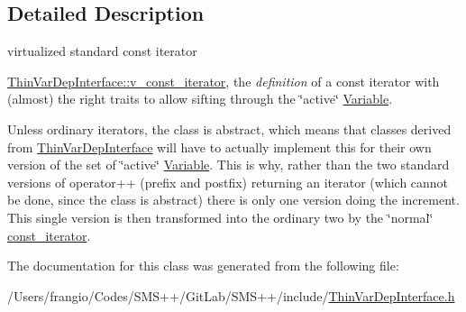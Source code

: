 \subsection{Detailed Description}
virtualized standard const iterator 

\mbox{\hyperlink{class_s_m_spp__di__unipi__it_1_1_thin_var_dep_interface_1_1v__const__iterator}{Thin\+Var\+Dep\+Interface\+::v\+\_\+const\+\_\+iterator}}, the {\itshape definition} of a const iterator with (almost) the right traits to allow sifting through the \char`\"{}active\char`\"{} \mbox{\hyperlink{class_s_m_spp__di__unipi__it_1_1_variable}{Variable}}.

Unless ordinary iterators, the class is abstract, which means that classes derived from \mbox{\hyperlink{class_s_m_spp__di__unipi__it_1_1_thin_var_dep_interface}{Thin\+Var\+Dep\+Interface}} will have to actually implement this for their own version of the set of \char`\"{}active\char`\"{} \mbox{\hyperlink{class_s_m_spp__di__unipi__it_1_1_variable}{Variable}}. This is why, rather than the two standard versions of operator++ (prefix and postfix) returning an iterator (which cannot be done, since the class is abstract) there is only one version doing the increment. This single version is then transformed into the ordinary two by the \char`\"{}normal\char`\"{} \mbox{\hyperlink{class_s_m_spp__di__unipi__it_1_1_thin_var_dep_interface_1_1const__iterator}{const\+\_\+iterator}}. 

The documentation for this class was generated from the following file\+:\begin{DoxyCompactItemize}
\item 
/\+Users/frangio/\+Codes/\+S\+M\+S++/\+Git\+Lab/\+S\+M\+S++/include/\mbox{\hyperlink{_thin_var_dep_interface_8h}{Thin\+Var\+Dep\+Interface.\+h}}\end{DoxyCompactItemize}
